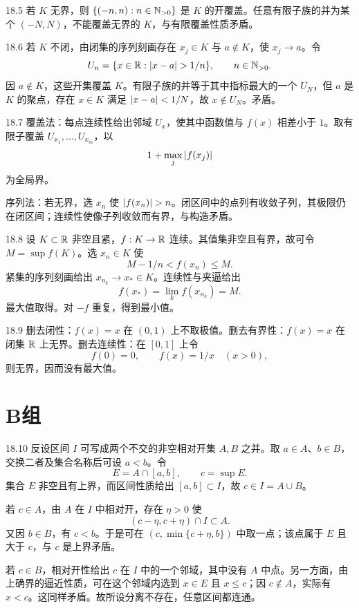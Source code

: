 \begin{solution}{18.5}
若 \(K\) 无界，则 \(\{(-n,n):n\in\mathbb{N}_{>0}\}\) 是 \(K\) 的开覆盖。任意有限子族的并为某个 \((-N,N)\)，不能覆盖无界的 \(K\)，与有限覆盖性质矛盾。
\end{solution}

\begin{solution}{18.6}
若 \(K\) 不闭，由闭集的序列刻画存在 \(x_j\in K\) 与 \(a\notin K\)，使 \(x_j\to a\)。令
\[
 U_n=\{x\in\R:\abs{x-a}>1/n\},\qquad n\in\Npos.
\]
因 \(a\notin K\)，这些开集覆盖 \(K\)。有限子族的并等于其中指标最大的一个 \(U_N\)，但 \(a\) 是 \(K\) 的聚点，存在 \(x\in K\) 满足 \(\left|x-a\right|<1/N\)，故 \(x\notin U_N\)。矛盾。
\end{solution}

\begin{solution}{18.7}
覆盖法：每点连续性给出邻域 \(U_x\)，使其中函数值与 \(f(x)\) 相差小于 \(1\)。取有限子覆盖 \(U_{x_1},\ldots,U_{x_m}\)，以
\[
 1+\max_j\left|f(x_j)\right|
\]
为全局界。

序列法：若无界，选 \(x_n\) 使 \(\abs{f(x_n)}>n\)。闭区间中的点列有收敛子列，其极限仍在闭区间；连续性使像子列收敛而有界，与构造矛盾。
\end{solution}

\begin{solution}{18.8}
设 \(K\subset\mathbb{R}\) 非空且紧，\(f:K\to\mathbb{R}\) 连续。其值集非空且有界，故可令 \(M=\sup f(K)\)。选 \(x_n\in K\) 使
\[
 M-1/n<f(x_n)\le M.
\]
紧集的序列刻画给出 \(x_{n_k}\to x_*\in K\)。连续性与夹逼给出
\[
 f(x_*)=\lim_k f(x_{n_k})=M.
\]
最大值取得。对 \(-f\) 重复，得到最小值。
\end{solution}

\begin{solution}{18.9}
删去闭性：\(f(x)=x\) 在 \((0,1)\) 上不取极值。删去有界性：\(f(x)=x\) 在闭集 \(\mathbb{R}\) 上无界。删去连续性：在 \([0,1]\) 上令
\[
 f(0)=0,\qquad f(x)=1/x\quad(x>0),
\]
则无界，因而没有最大值。
\end{solution}

\section*{B组}

\begin{solution}{18.10}
反设区间 \(I\) 可写成两个不交的非空相对开集 \(A,B\) 之并。取 \(a\in A\)、\(b\in B\)，交换二者及集合名称后可设 \(a<b\)。令
\[
 E=A\cap[a,b],\qquad c=\sup E.
\]
集合 \(E\) 非空且有上界，而区间性质给出 \([a,b]\subset I\)，故 \(c\in I=A\cup B\)。

若 \(c\in A\)，由 \(A\) 在 \(I\) 中相对开，存在 \(\eta>0\) 使
\[
 (c-\eta,c+\eta)\cap I\subset A.
\]
又因 \(b\in B\)，有 \(c<b\)。于是可在 \((c,\min\{c+\eta,b\})\) 中取一点；该点属于 \(E\) 且大于 \(c\)，与 \(c\) 是上界矛盾。

若 \(c\in B\)，相对开性给出 \(c\) 在 \(I\) 中的一个邻域，其中没有 \(A\) 中点。另一方面，由上确界的逼近性质，可在这个邻域内选到 \(x\in E\) 且 \(x\le c\)；因 \(c\notin A\)，实际有 \(x<c\)。这同样矛盾。故所设分离不存在，任意区间都连通。
\end{solution}

